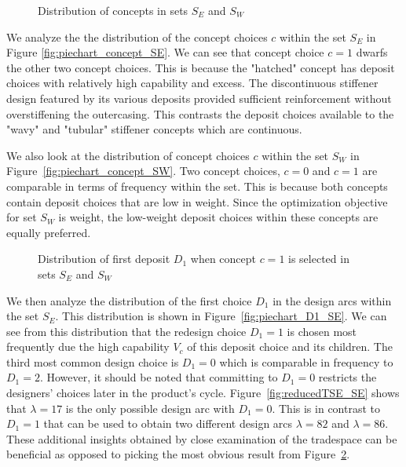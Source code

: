 \begin{figure}[h!]
	\centering
	\caption{Distribution of concepts in sets $S_E$ and $S_W$}
	\label{fig:piechart_concept}
\end{figure}

We analyze the the distribution of the concept choices $c$ within the set $S_E$ in Figure \ref{fig:piechart_concept_SE}. We can see that concept choice $c=1$ dwarfs the other two concept choices. This is because the "hatched" concept has deposit choices with relatively high capability and excess. The discontinuous stiffener design featured by its various deposits provided sufficient reinforcement without overstiffening the outercasing. This contrasts the deposit choices available to the "wavy" and "tubular" stiffener concepts which are continuous.

We also look at the distribution of concept choices $c$ within the set $S_W$ in Figure~\ref{fig:piechart_concept_SW}. Two concept choices, $c=0$ and $c=1$ are comparable in terms of frequency within the set. This is because both concepts contain deposit choices that are low in weight. Since the optimization objective for set $S_W$ is weight, the low-weight deposit choices within these concepts are equally preferred.

\begin{figure}[h!]
	\centering
	\caption{Distribution of first deposit $D_1$ when concept $c=1$ is selected in sets $S_E$ and $S_W$}
	\label{fig:piechart_D1}
\end{figure}

We then analyze the distribution of the first choice $D_1$ in the design arcs within the set $S_E$. This distribution is shown in Figure~\ref{fig:piechart_D1_SE}. We can see from this distribution that the redesign choice $D_1 = 1$ is chosen most frequently due the high capability $V_c$ of this deposit choice and its children. The third most common design choice is $D_1 = 0$ which is comparable in frequency to $D_1 = 2$. However, it should be noted that committing to $D_1 = 0$ restricts the designers' choices later in the product's cycle. Figure~\ref{fig:reducedTSE_SE} shows that $\lambda = 17$ is the only possible design arc with $D_1 = 0$. This is in contrast to $D_1 = 1$ that can be used to obtain two different design arcs $\lambda = 82$ and $\lambda = 86$. These additional insights obtained by close examination of the tradespace can be beneficial as opposed to picking the most obvious result from Figure~\ref{fig:piechart_D1}.

